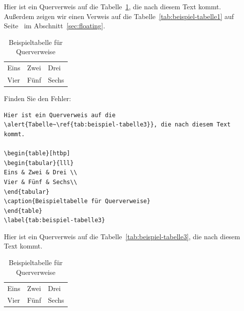 \begin{frame}[fragile]



	Hier ist ein Querverweis auf die 
	Tabelle~\ref{tab:beispiel-tabelle2}, die nach diesem Text kommt. 
	Außerdem zeigen wir einen Verweis auf die 
	Tabelle~\ref{tab:beispiel-tabelle1} auf 
	Seite~\pageref{tab:beispiel-tabelle1} 
	im Abschnitt~\ref{sec:floating}.
	
	\begin{table}[htbp]
	\centering
	\begin{tabular}{lll}
	Eins & Zwei & Drei \\
	Vier & Fünf & Sechs\\
	\end{tabular}
	\caption{Beispieltabelle für Querverweise}
	\label{tab:beispiel-tabelle2}
	\end{table}

\end{frame}


\begin{frame}[fragile]

Finden Sie den Fehler:

{\small 
	
\begin{lstlisting}
Hier ist ein Querverweis auf die 
\alert{Tabelle~\ref{tab:beispiel-tabelle3}}, die nach diesem Text kommt. 

\begin{table}[htbp]
\begin{tabular}{lll}
Eins & Zwei & Drei \\
Vier & Fünf & Sechs\\
\end{tabular}
\caption{Beispieltabelle für Querverweise}
\end{table}
\label{tab:beispiel-tabelle3}
\end{lstlisting}
}

\vspace{1cm}

\pause 

Hier ist ein Querverweis auf die 
\alert{Tabelle~\ref{tab:beispiel-tabelle3}}, die nach diesem Text kommt. 

\begin{table}[htbp]
	\centering
	\begin{tabular}{lll}
		Eins & Zwei & Drei \\
		Vier & Fünf & Sechs\\
	\end{tabular}
	\caption{Beispieltabelle für Querverweise}
\end{table}

\label{tab:beispiel-tabelle3}

\end{frame}


